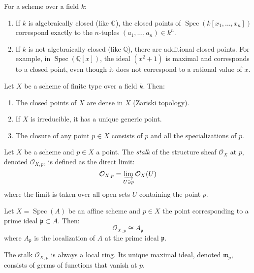 \documentclass[12pt]{article}
\begin{document}
\begin{remark}
    For a scheme over a field $k$:
    \begin{enumerate}
        \item If $k$ is algebraically closed (like $\mathbb{C}$), the closed points of $\operatorname{Spec}(k[x_1,\ldots,x_n])$ correspond exactly to the $n$-tuples $(a_1,\ldots,a_n) \in k^n$.
        \item If $k$ is not algebraically closed (like $\mathbb{Q}$), there are additional closed points. For example, in $\operatorname{Spec}(\mathbb{Q}[x])$, the ideal $(x^2 + 1)$ is maximal and corresponds to a closed point, even though it does not correspond to a rational value of $x$.
    \end{enumerate}
\end{remark}

\begin{proposition}
    Let $X$ be a scheme of finite type over a field $k$. Then:
    \begin{enumerate}
        \item The closed points of $X$ are dense in $X$ (Zariski topology).
        \item If $X$ is irreducible, it has a unique generic point.
        \item The closure of any point $p \in X$ consists of $p$ and all the specializations of $p$.
    \end{enumerate}
\end{proposition}

\begin{definition}
    Let $X$ be a scheme and $p \in X$ a point. The \textit{stalk} of the structure sheaf $\mathcal{O}_X$ at $p$, denoted $\mathcal{O}_{X,p}$, is defined as the direct limit:
    \[
        \mathcal{O}_{X,p} = \varinjlim_{U \ni p} \mathcal{O}_X(U)
    \]
    where the limit is taken over all open sets $U$ containing the point $p$.
\end{definition}

\begin{proposition}
    Let $X = \operatorname{Spec}(A)$ be an affine scheme and $p \in X$ the point corresponding to a prime ideal $\mathfrak{p} \subset A$. Then:
    \[
        \mathcal{O}_{X,p} \cong A_{\mathfrak{p}}
    \]
    where $A_{\mathfrak{p}}$ is the localization of $A$ at the prime ideal $\mathfrak{p}$.
\end{proposition}

\begin{remark}
    The stalk $\mathcal{O}_{X,p}$ is always a local ring. Its unique maximal ideal, denoted $\mathfrak{m}_p$, consists of germs of functions that vanish at $p$.
\end{remark}
\end{document}
